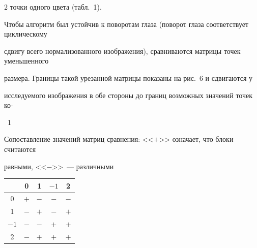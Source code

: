 \begin{multicols}{2}
точки одного цвета (табл.~1).








Чтобы алгоритм был устойчив к поворотам глаза (поворот глаза соответствует циклическому 


сдвигу всего нормализованного изображения), сравниваются матрицы точек уменьшенного 


размера. Границы такой урезанной матрицы показаны на рис.~6 и сдвигаются у 


исследуемого изображения в обе стороны до границ возможных значений точек ко-\linebreak\vspace*{-12pt}


\columnbreak










\noindent


\begin{center}


\noindent


\parbox{51mm}{{\tablename~1}\ \ \small{Сопоставление значений матриц сравнения: <<$+$>> означает, что блоки считаются 


равными, <<$-$>>~--- различными}}


\end{center}







\begin{center}


\tabcolsep=9pt


\begin{tabular}{|c|c|c|c|c|}


\hline


&0&1&$-1$&2\\


\hline


0&$+$&$-$&$-$&$-$\\


1&$-$&$+$&$-$&$+$\\


$-1$\hphantom{$-$}&$-$&$-$&$+$&$+$\\


2&$-$&$+$&$+$&$+$\\



\end{tabular}
\end{center}
\end{multicols}
